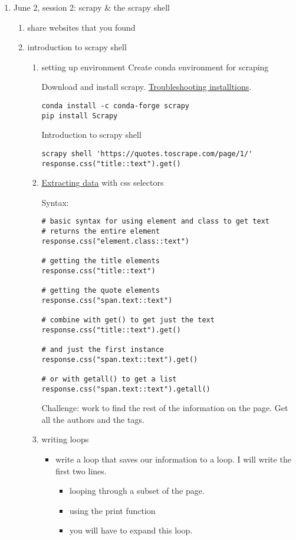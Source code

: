 \documentclass[11pt]{article}
\begin{document}
\begin{enumerate}
\item June 2, session 2: scrapy \& the scrapy shell
\label{sec:org10dd84e}
\begin{enumerate}
\item share websites that you found
\label{sec:orgedc68f8}
\item introduction to scrapy shell
\label{sec:org171b6e9}
\begin{enumerate}
\item setting up environment
\label{sec:orgaee1d50}
Create conda environment for scraping

Download and install scrapy. \href{https://docs.scrapy.org/en/latest/intro/install.html\#intro-install}{Troubleshooting installtions}.

\begin{verbatim}
conda install -c conda-forge scrapy
pip install Scrapy
\end{verbatim}

Introduction to scrapy shell

\begin{verbatim}
scrapy shell 'https://quotes.toscrape.com/page/1/'
response.css("title::text").get()
\end{verbatim}

\item \href{https://docs.scrapy.org/en/latest/intro/tutorial.html\#extracting-data}{Extracting data} with css selectors
\label{sec:orga810923}

Syntax:

\begin{verbatim}
# basic syntax for using element and class to get text
# returns the entire element
response.css("element.class::text")

# getting the title elements
response.css("title::text")

# getting the quote elements
response.css("span.text::text")

# combine with get() to get just the text
response.css("title::text").get()

# and just the first instance
response.css("span.text::text").get()

# or with getall() to get a list
response.css("span.text::text").getall()
\end{verbatim}

Challenge: work to find the rest of the information on the page. Get
all the authors and the tags.

\item writing loops
\label{sec:org2bedf95}
\begin{itemize}
\item write a loop that saves our information to a loop. I will
write the first two lines.
\begin{itemize}
\item looping through a subset of the page.
\item using the print function
\item you will have to expand this loop.
\end{itemize}
\end{itemize}


\end{enumerate}
\end{enumerate}
\end{enumerate}
\end{document}

